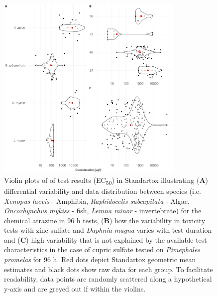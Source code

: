 \documentclass[journal,datadescriptor,accept,moreauthors,pdftex]{Definitions/mdpi}
\begin{document}
\begin{figure}[H]
    \centering
    \includegraphics[width=0.8\textwidth]{article/figures/results_variability.png}
    \caption{Violin plots of of test results (EC\textsubscript{50}) in Standartox illustrating (\textbf{A}) differential variability and data distribution between species (i.e. \textit{Xenopus laevis} - Amphibia, \textit{Raphidocelis subcapitata} - Algae, \textit{Oncorhynchus mykiss} - fish, \textit{Lemna minor} - invertebrate) for the chemical atrazine in 96 h tests, (\textbf{B}) how the variability in toxicity tests with zinc sulfate and \textit{Daphnia magna} varies with test duration and (\textbf{C}) high variability that is not explained by the available test characteristics in the case of cupric sulfate tested on \textit{Pimephales promelas} for 96 h. Red dots depict Standartox geometric mean estimates and black dots show raw data for each group. To facilitate readability, data points are randomly scattered along a hypothetical y-axis and are greyed out if within the violins.}
    \label{fig:stx-variability}
\end{figure}
\end{document}
